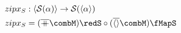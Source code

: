 \documentclass[preview]{standalone}
\begin{document}
\begin{align*}
  zipx_S &: \vect{\mathcal{S}(\alpha)} \rightarrow \mathcal{S}(\vect{\alpha}) \\
  zipx_S & = (\wrapdf{\fcat} \combM) \redS \circ (\wrapdf{\vect{}} \combM) \fMapS
\end{align*}
\end{document}

